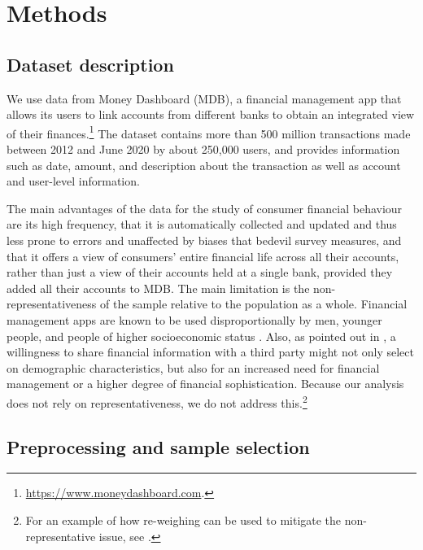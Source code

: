 
\section{Methods}%
\label{sec:methods}


\subsection{Dataset description}
\label{par:dataset_description}

We use data from Money Dashboard (MDB), a financial management app that allows
its users to link accounts from different banks to obtain an integrated view of
their
finances.\footnote{\href{https://www.moneydashboard.com}{https://www.moneydashboard.com}.}
The dataset contains more than 500 million transactions made between 2012 and
June 2020 by about 250,000 users, and provides information such as date,
amount, and description about the transaction as well as account and user-level
information.

The main advantages of the data for the study of consumer financial behaviour
are its high frequency, that it is automatically collected and updated and thus
less prone to errors and unaffected by biases that bedevil survey measures, and
that it offers a view of consumers' entire financial life across all their
accounts, rather than just a view of their accounts held at a single bank,
provided they added all their accounts to MDB. The main limitation is the
non-representativeness of the sample relative to the population as a whole.
Financial management apps are known to be used disproportionally by men,
younger people, and people of higher socioeconomic status
\citep{carlin2019generational}. Also, as pointed out in
\citet{gelman2014harnessing}, a willingness to share financial information with
a third party might not only select on demographic characteristics, but also
for an increased need for financial management or a higher degree of financial
sophistication. Because our analysis does not rely on representativeness, we do
not address this.\footnote{For an example of how re-weighing can be used to
mitigate the non-representative issue, see \citet{bourquin2020effects}.}


\subsection{Preprocessing and sample selection}%
\label{par:preprocessing_and_sample_selection}

